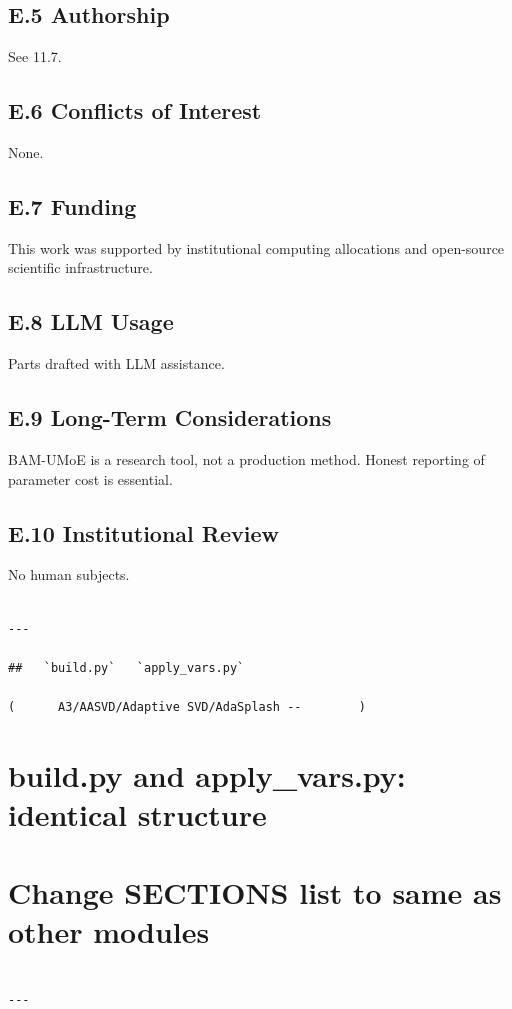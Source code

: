 \subsection{E.5 Authorship}

See  11.7.

\subsection{E.6 Conflicts of Interest}

None.

\subsection{E.7 Funding}

This work was supported by institutional computing allocations and open-source scientific infrastructure.

\subsection{E.8 LLM Usage}

Parts drafted with LLM assistance.

\subsection{E.9 Long-Term Considerations}

BAM-UMoE is a research tool, not a production method. Honest reporting 
of parameter cost is essential.

\subsection{E.10 Institutional Review}

No human subjects.
\begin{lstlisting}

---

##   `build.py`   `apply_vars.py`

(      A3/AASVD/Adaptive SVD/AdaSplash --        )

\end{lstlisting}
\section{build.py and apply\_vars.py: identical structure}
\section{Change SECTIONS list to same as other modules}
\begin{lstlisting}

---
\end{lstlisting}